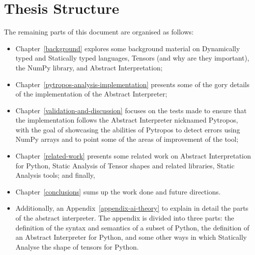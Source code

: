 
\section{Thesis Structure}\label{thesis-structure}

The remaining parts of this document are organised as follows:

\begin{itemize}
\tightlist
\item Chapter~\ref{background} explores some background material on Dynamically typed and
  Statically typed languages, Tensors (and why are they important), the NumPy library, and
  Abstract Interpretation;
\item Chapter~\ref{pytropos-analysis-implementation} presents some of the gory details of
  the implementation of the Abstract Interpreter;
\item Chapter~\ref{validation-and-discussion} focuses on the tests made to ensure that the
  implementation follows the Abstract Interpreter nicknamed Pytropos, with the goal of
  showcasing the abilities of Pytropos to detect errors using NumPy arrays and to
  point some of the areas of improvement of the tool;
\item Chapter~\ref{related-work} presents some related work on Abstract Interpretation for
  Python, Static Analysis of Tensor shapes and related libraries, Static Analysis tools;
  and finally,
\item Chapter~\ref{conclusions} sums up the work done and future directions.
\item Additionally, an Appendix~\ref{appendix-ai-theory} to explain in detail the parts of
  the abstract interpreter. The appendix is divided into three parts: the definition of
  the syntax and semantics of a subset of Python, the definition of an Abstract
  Interpreter for Python, and some other ways in which Statically Analyse the shape of
  tensors for Python.
\end{itemize}
